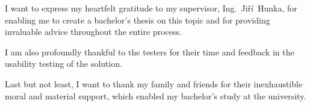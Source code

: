 \documentclass[english,bachelor,unicode,oneside,bw]{ctufit-thesis}
\begin{document}
 
\frontmatter\frontmatterinit %


\thispagestyle{empty}\cleardoublepage\maketitle %

\imprintpage %

\tableofcontents %
\listoffigures %
\begingroup
\let\clearpage\relax
\listoftables %
\thectufitlistingscommand
\endgroup
{}

\begin{acknowledgmentpage}
I want to express my heartfelt gratitude to my supervisor, Ing.~Jiří~Hunka, for enabling me to create a bachelor's thesis on this topic and for providing invaluable advice throughout the entire process.

\vspace{1em}

I am also profoundly thankful to the testers for their time and feedback in the usability testing of the solution.

\vspace{1em}

Last but not least, I want to thank my family and friends for their inexhaustible moral and material support, which enabled my bachelor's study at the university.
\end{acknowledgmentpage}
\end{document}
